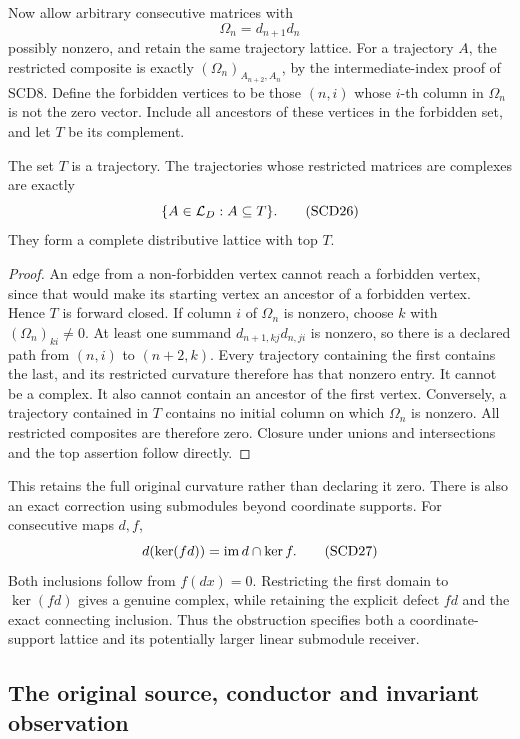 Now allow arbitrary consecutive matrices with
\[
 \Omega_n=d_{n+1}d_n
 \tag{SCD25}
\]
possibly nonzero, and retain the same trajectory lattice.
For a trajectory \(A\), the restricted composite is exactly
\((\Omega_n)_{A_{n+2},A_n}\), by the intermediate-index proof of
SCD8. Define the forbidden vertices to be those \((n,i)\)
whose \(i\)-th column in \(\Omega_n\) is not the zero vector.
Include all ancestors of these vertices in the forbidden set,
and let \(T\) be its complement.

\begin{theorem}
The set \(T\) is a trajectory. The trajectories whose restricted
matrices are complexes are exactly
\[
 \{A\in\mathcal L_D:A\subseteq T\}.
 \tag{SCD26}
\]
They form a complete distributive lattice with top \(T\).
\end{theorem}
\begin{proof}
An edge from a non-forbidden vertex cannot reach a forbidden
vertex, since that would make its starting vertex an ancestor
of a forbidden vertex. Hence \(T\) is forward closed.
If column \(i\) of \(\Omega_n\) is nonzero, choose \(k\)
with \((\Omega_n)_{ki}\ne0\). At least one summand
\(d_{n+1,kj}d_{n,ji}\) is nonzero, so there is a declared path
from \((n,i)\) to \((n+2,k)\). Every trajectory containing
the first contains the last, and its restricted curvature
therefore has that nonzero entry. It cannot be a complex.
It also cannot contain an ancestor of the first vertex.
Conversely, a trajectory contained in \(T\) contains no initial
column on which \(\Omega_n\) is nonzero. All restricted composites
are therefore zero. Closure under unions and intersections and
the top assertion follow directly.
\end{proof}

This retains the full original curvature rather than declaring it zero.
There is also an exact correction using submodules beyond coordinate
supports. For consecutive maps \(d,f\),
\[
 d(\ker(fd))=\operatorname{im} d\cap\ker f .
 \tag{SCD27}
\]
Both inclusions follow from \(f(dx)=0\). Restricting the first
domain to \(\ker(fd)\) gives a genuine complex, while retaining
the explicit defect \(fd\) and the exact connecting inclusion.
Thus the obstruction specifies both a coordinate-support lattice
and its potentially larger linear submodule receiver.

\subsection{The original source, conductor and invariant observation}

